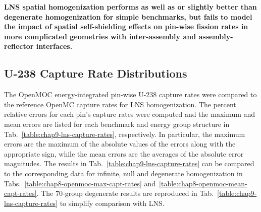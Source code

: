 \begin{emphbox}
\textbf{\ac{LNS} spatial homogenization performs as well as or slightly better than degenerate homogenization for simple benchmarks, but fails to model the impact of spatial self-shielding effects on pin-wise fission rates in more complicated geometries with inter-assembly and assembly-reflector interfaces.}
\end{emphbox}

\subsection{U-238 Capture Rate Distributions}
\label{subsec:chap9-lns-capt-rates}

The OpenMOC energy-integrated pin-wise U-238 capture rates were compared to the reference OpenMC capture rates for \ac{LNS} homogenization. The percent relative errors for each pin's capture rates were computed and the maximum and mean errors are listed for each benchmark and energy group structure in Tab.~\ref{table:chap9-lns-capture-rates}, respectively. In particular, the maximum errors are the maximum of the absolute values of the errors along with the appropriate sign, while the mean errors are the averages of the absolute error magnitudes. The results in Tab.~\ref{table:chap9-lns-capture-rates} can be compared to the corresponding data for infinite, null and degenerate homogenization in Tabs.~\ref{table:chap8-openmoc-max-capt-rates} and~\ref{table:chap8-openmoc-mean-capt-rates}. The 70-group degenerate results are reproduced in Tab.~\ref{table:chap9-lns-capture-rates} to simplify comparison with \ac{LNS}.

